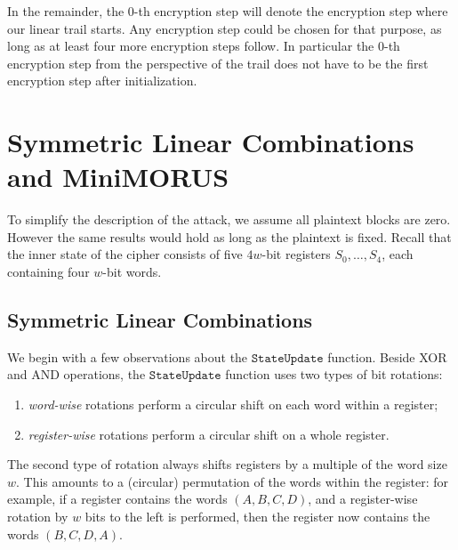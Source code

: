 \documentclass{llncs}
\newcommand{\cipher}[1]{\textsf{#1}}
\newcommand\StateUpdate{\ensuremath{\texttt{StateUpdate}}}
\newcommand\rotl{\ensuremath{\lll}}
\newcommand\rotlxy{\ensuremath{\lll_W}}
\begin{document}
In the remainder, the $0$-th encryption step will denote the encryption step where our linear trail starts. Any encryption step could be chosen for that purpose, as long as at least four more encryption steps follow. In particular the $0$-th encryption step from the perspective of the trail does not have to be the first encryption step after initialization.

%

\section{Symmetric Linear Combinations and \cipher{MiniMORUS}}
\label{sec:introminimorus}

To simplify the description of the attack, we assume all plaintext blocks are zero. However the same results would hold as long as the plaintext is fixed. Recall that the inner state of the cipher consists of five $4w$-bit registers $S_0,\dots,S_4$, each containing four $w$-bit words.

\subsection{Symmetric Linear Combinations}

We begin with a few observations about the \StateUpdate{} function. Beside XOR and AND operations, the \StateUpdate{} function uses two types of bit rotations:
\begin{enumerate}
\item \emph{word-wise} rotations perform a circular shift on each word within a register;
\item \emph{register-wise} rotations perform a circular shift on a whole register.
\end{enumerate}
The second type of rotation always shifts registers by a multiple of the word size $w$. This amounts to a (circular) permutation of the words within the register: for example, if a register contains the words $(A, B, C, D)$, and a register-wise rotation by $w$ bits to the left is performed, then the register now contains the words $(B, C, D, A)$.
\end{document}
